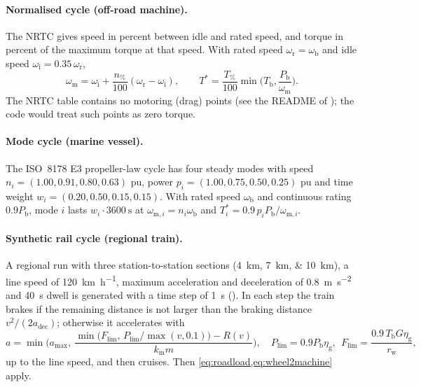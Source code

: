 \paragraph{Normalised cycle (off-road machine).} The NRTC \cite{eu2017_654} gives speed in percent between idle and rated speed, and torque in percent of the maximum torque at that speed. With rated speed $\omega_\mathrm{r}=\omega_\mathrm{b}$ and idle speed $\omega_\mathrm{i}=0.35\,\omega_\mathrm{r}$,
\begin{equation}
\omega_\mathrm{m}=\omega_\mathrm{i}+\frac{n_\%}{100}(\omega_\mathrm{r}-\omega_\mathrm{i}),\qquad T^*=\frac{T_\%}{100}\min\Big(T_\mathrm{b},\frac{P_\mathrm{b}}{\omega_\mathrm{m}}\Big).
\label{eq:nrtc}
\end{equation}
The NRTC table contains no motoring (drag) points (see the README of ); the code would treat such points as zero torque.

\paragraph{Mode cycle (marine vessel).} The ISO~8178 E3 propeller-law cycle \cite{iso8178_4} has four steady modes with speed $n_i=(1.00,0.91,0.80,0.63)$ pu, power $p_i=(1.00,0.75,0.50,0.25)$ pu and time weight $w_i=(0.20,0.50,0.15,0.15)$. With rated speed $\omega_\mathrm{b}$ and continuous rating $0.9P_\mathrm{b}$, mode $i$ lasts $w_i\cdot\SI{3600}{\second}$ at $\omega_{\mathrm{m},i}=n_i\omega_\mathrm{b}$ and $T_i^*=0.9\,p_iP_\mathrm{b}/\omega_{\mathrm{m},i}$.

\paragraph{Synthetic rail cycle (regional train).} A regional run with three station-to-station sections (\SIlist{4;7;10}{\kilo\metre}), a line speed of \SI{120}{\kilo\metre\per\hour}, maximum acceleration and deceleration of \SI{0.8}{\metre\per\second\squared} and \SI{40}{\second} dwell is generated with a time step of \SI{1}{\second} (). In each step the train brakes if the remaining distance is not larger than the braking distance $v^2/(2a_\mathrm{dec})$; otherwise it accelerates with
\begin{equation}
a=\min\Big(a_\mathrm{max},\ \frac{\min\big(F_\mathrm{lim},\,P_\mathrm{lim}/\max(v,0.1)\big)-R(v)}{k_\mathrm{m}m}\Big),\quad P_\mathrm{lim}=0.9P_\mathrm{b}\eta_\mathrm{g},\ \ F_\mathrm{lim}=\frac{0.9\,T_\mathrm{b}G\eta_\mathrm{g}}{r_\mathrm{w}},
\label{eq:rail}
\end{equation}
up to the line speed, and then cruises. Then \cref{eq:roadload,eq:wheel2machine} apply.

